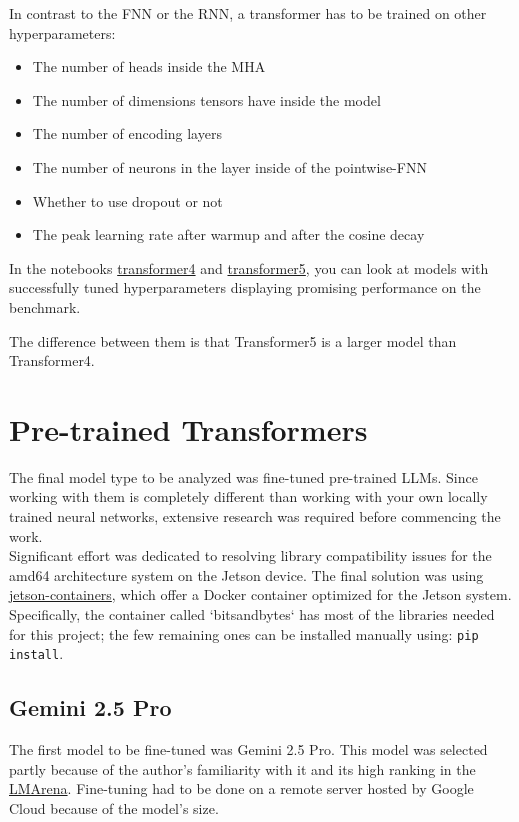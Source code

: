 \documentclass{article}
\begin{document}
In contrast to the FNN or the RNN, a transformer has to be trained on other hyperparameters:
\begin{itemize}
    \item The number of heads inside the MHA
    \item The number of dimensions tensors have inside the model
    \item The number of encoding layers
    \item The number of neurons in the layer inside of the pointwise-FNN
    \item Whether to use dropout or not
    \item The peak learning rate after warmup and after the cosine decay
\end{itemize}


In the notebooks \href{https://github.com/AntonStantan/matura/blob/main/transformer/transformer4.ipynb}{transformer4} and \href{https://github.com/AntonStantan/matura/blob/main/transformer/transformer5.ipynb}{transformer5}, you can look at models with successfully tuned hyperparameters displaying promising performance on the benchmark.

The difference between them is that Transformer5 is a larger model than Transformer4.

\section{Pre-trained Transformers}

The final model type to be analyzed was fine-tuned pre-trained LLMs. Since working with them is completely different than working with your own locally trained neural networks, extensive research was required before commencing the work.
\\[1em]
Significant effort was dedicated to resolving library compatibility issues for the amd64 architecture system on the Jetson device. The final solution was using \href{https://github.com/dusty-nv/jetson-containers}{jetson-containers}, which offer a Docker container optimized for the Jetson system. Specifically, the container called `bitsandbytes` has most of the libraries needed for this project; the few remaining ones can be installed manually using: \texttt{pip install}.


\subsection{Gemini 2.5 Pro}
The first model to be fine-tuned was Gemini 2.5 Pro. This model was selected partly because of the author's familiarity with it and its high ranking in the \href{https://lmarena.ai/leaderboard}{LMArena}.
Fine-tuning had to be done on a remote server hosted by Google Cloud because of the model's size.
\end{document}
